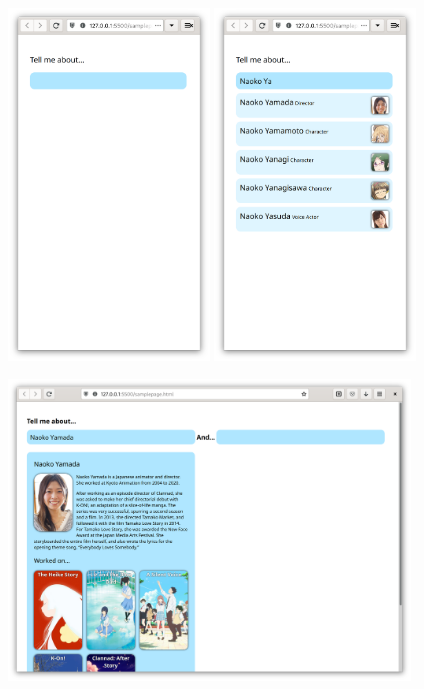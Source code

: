 \documentclass[a4paper]{article}
\begin{document}
\includegraphics[width=0.4\textwidth]{mockups/Base page.png}
\includegraphics[width=0.4\textwidth]{mockups/search.png}

\includegraphics[width=0.8\textwidth]{mockups/lookedup.png}
\end{document}
